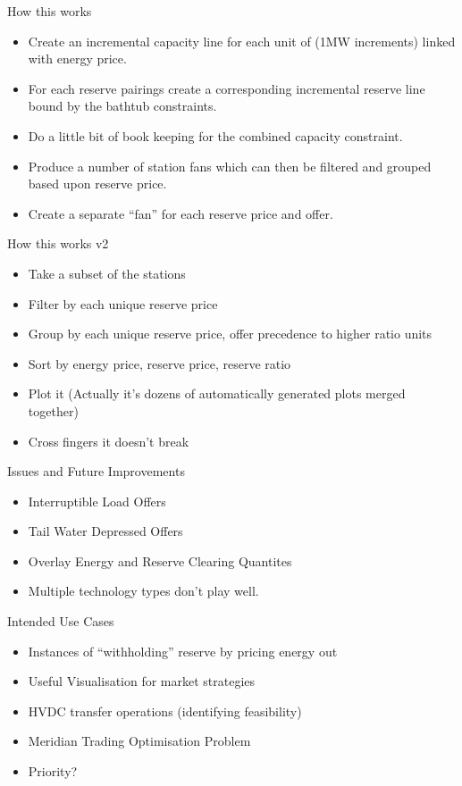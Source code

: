 \documentclass[xcolor=x11names,compress]{beamer}
\renewcommand{\(}{\begin{columns}}
\renewcommand{\)}{\end{columns}}
\newcommand{\<}[1]{\begin{column}{#1}}
\renewcommand{\>}{\end{column}}
\begin{document}
\begin{frame}{How this works}
\begin{itemize}
\item Create an incremental capacity line for each unit of (1MW increments) linked with energy price.
\item For each reserve pairings create a corresponding incremental reserve line bound by the bathtub constraints.
\item Do a little bit of book keeping for the combined capacity constraint.
\item Produce a number of station fans which can then be filtered and grouped
based upon reserve price.
\item Create a separate ``fan'' for each reserve price and offer.
\end{itemize}
\end{frame}

\begin{frame}{How this works v2}
\begin{itemize}
\item Take a subset of the stations
\item Filter by each unique reserve price
\item Group by each unique reserve price, offer precedence to higher ratio units
\item Sort by energy price, reserve price, reserve ratio
\item Plot it (Actually it's dozens of automatically generated plots merged together)
\item Cross fingers it doesn't break
\end{itemize}
\end{frame}

\begin{frame}{Issues and Future Improvements}
\begin{itemize}
\item Interruptible Load Offers
\item Tail Water Depressed Offers
\item Overlay Energy and Reserve Clearing Quantites
\item Multiple technology types don't play well.
\end{itemize}
\end{frame}

\begin{frame}{Intended Use Cases}
\begin{itemize}
\item Instances of ``withholding'' reserve by pricing energy out
\item Useful Visualisation for market strategies
\item HVDC transfer operations (identifying feasibility)
\item Meridian Trading Optimisation Problem
\item Priority?
\end{itemize}
\end{frame}
\end{document}
